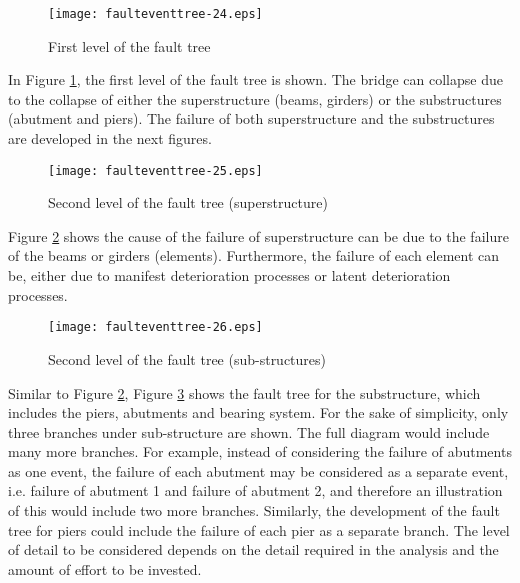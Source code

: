 \begin{figure}[h]
\begin{center}
\texttt{[image: faulteventtree-24.eps]}
\caption{First level of the fault tree}\label{figeventfault:8}
\end{center}
\end{figure}

In Figure \ref{figeventfault:8}, the first level of the fault tree is shown. The bridge
can collapse due to the collapse of either the superstructure (beams, girders) or
the substructures (abutment and piers). The failure of both superstructure and
the substructures are developed in the next figures.

\begin{figure}[h]
\begin{center}
\texttt{[image: faulteventtree-25.eps]}
\caption{Second level of the fault tree (superstructure)}\label{figeventfault:9}
\end{center}
\end{figure}

Figure \ref{figeventfault:9} shows the cause of the failure of superstructure can be due to the
failure of the beams or girders (elements). Furthermore, the failure of each
element can be, either due to manifest deterioration processes or latent
deterioration processes.

\begin{figure}[h]
\begin{center}
\texttt{[image: faulteventtree-26.eps]}
\caption{Second level of the fault tree (sub-structures)}\label{figeventfault:10}
\end{center}
\end{figure}

Similar to Figure \ref{figeventfault:9}, Figure \ref{figeventfault:10} shows the fault tree for the
substructure, which includes the piers, abutments and bearing system. For the
sake of simplicity, only three branches under sub-structure are shown. The full
diagram would include many more branches. For example, instead of considering the
failure of abutments as one event, the failure of each abutment may be considered
as a separate event, i.e. failure of abutment 1 and failure of abutment 2, and
therefore an illustration of this would include two more branches. Similarly, the
development of the fault tree for piers could include the failure of each pier as
a separate branch. The level of detail to be considered depends on the detail
required in the analysis and the amount of effort to be invested.

